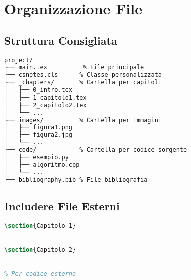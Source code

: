 \documentclass{csnotes}
\begin{document}

\section{Organizzazione File}

\subsection{Struttura Consigliata}

\begin{lstlisting}[language=bash]
project/
├── main.tex          % File principale
├── csnotes.cls      % Classe personalizzata
├── _chapters/       % Cartella per capitoli
│   ├── 0_intro.tex
│   ├── 1_capitolo1.tex
│   ├── 2_capitolo2.tex
│   └── ...
├── images/          % Cartella per immagini
│   ├── figura1.png
│   ├── figura2.jpg
│   └── ...
├── code/            % Cartella per codice sorgente
│   ├── esempio.py
│   ├── algoritmo.cpp
│   └── ...
└── bibliography.bib % File bibliografia
\end{lstlisting}

\subsection{Includere File Esterni}

\begin{example}
\begin{lstlisting}[language=TeX]
% Nel main.tex
\section{Capitolo 1}


\section{Capitolo 2}


% Per codice esterno

\end{lstlisting}
\end{example}

\end{document}
